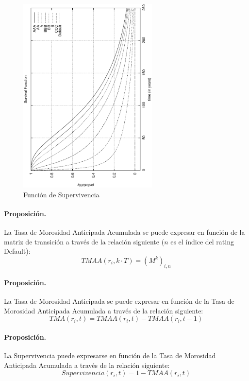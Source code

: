 \begin{figure}[!hb]
\begin{center}
\includegraphics[height=10cm, angle=-90]{./images/survival.ps}
\caption{Funci\'on de Supervivencia}
\label{survival}
\end{center}
\end{figure}

\paragraph{Proposici\'on.} La Tasa de Morosidad Anticipada Acumulada se 
puede expresar en funci\'on de la matriz de transici\'on a trav\'es de la
relaci\'on siguiente ($n$ es el \'indice del rating Default):
\begin{displaymath}
TMAA(r_i,k \cdot T) = (M^k)_{i,n}
\end{displaymath}

\paragraph{Proposici\'on.} La Tasa de Morosidad Anticipada se puede expresar 
en funci\'on de la Tasa de Morosidad Anticipada Acumulada a trav\'es de la
relaci\'on siguiente:
\begin{displaymath}
TMA(r_i, t) =  TMAA(r_i, t) - TMAA(r_i, t-1)
\end{displaymath}

\paragraph{Proposici\'on.} La Supervivencia puede expresarse en funci\'on de
la Tasa de Morosidad Anticipada Acumulada a trav\'es de la relaci\'on siguiente:
\begin{displaymath}
Supervivencia(r_i, t) =  1 - TMAA(r_i, t)
\end{displaymath}

